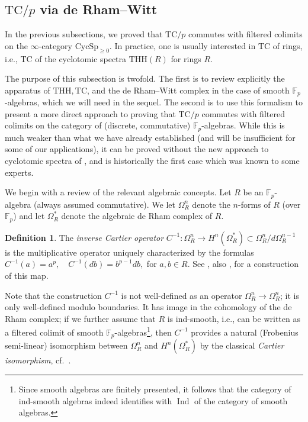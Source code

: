 \documentclass{amsart}
\newcommand{\THH}{\mathrm{THH}}
\theoremstyle{definition}
\newtheorem{definition}{Definition}[section]
\newcommand{\bb}{\mathbb}
\newcommand{\CycSp}{\mathrm{CycSp}}
\newcommand{\TC}{\mathrm{TC}}
\begin{document}
\subsection{$\TC/p$ via de Rham--Witt}

\label{dRWapproach}
In the previous subsections, we proved that $\TC/p$ commutes with filtered
colimits on the $\infty$-category $\CycSp_{\geq 0}$. In practice, one is
usually interested
in $\TC$ of rings, i.e., $\TC$ of the cyclotomic spectra $\THH(R)$ for rings
$R$. 

The purpose of this subsection is twofold. The first is to review explicitly the apparatus
of $\THH, \TC$, and the de Rham--Witt complex in the case of smooth
$\mathbb{F}_p$-algebras, which we will need in the sequel. The
second is to use this formalism to 
present a more direct approach to proving that $\TC/p$ commutes with
filtered  colimits on the category of (discrete, commutative) $\bb
F_p$-algebras. While this is much weaker than what we
have already established (and will be insufficient for some of our
applications), it can be proved without the new approach to cyclotomic spectra of
\cite{nikolaus-scholze}, and is historically the first case which was known to some experts.

We begin with a review of the relevant algebraic concepts. 
Let $R$ be an $\mathbb{F}_p$-algebra (always assumed commutative).  We let $\Omega^n_R$ denote the $n$-forms of $R$ (over $\mathbb{F}_p$) and let $\Omega_R^{\ast}$ denote the algebraic de Rham complex of $R$. 

\begin{definition} 
\label{cartier}
The \emph{inverse Cartier operator} $C^{-1}: \Omega^n_R \to
H^n(\Omega^{\ast}_R) \subset \Omega^n_R/d
\Omega^{n-1}_R$ is the multiplicative operator uniquely characterized by the formulas
\( C^{-1}(a) = a^p, \quad  C^{-1}(db) = b^{p-1} db,   \)
for $a, b \in R$. See \cite{Cartier1957}, also \cite[Prop.~3.3.4]{BLM}, for a construction of this map. 
\end{definition} 
Note that the construction $C^{-1}$ is not well-defined as an operator $\Omega^n_R \to
\Omega^n_R$;
it is only well-defined modulo boundaries. It has image in the
cohomology of the de Rham complex; if we further assume that $R$ is ind-smooth,
i.e., can be written as a filtered colimit of smooth $\mathbb{F}_p$-algebras\footnote{Since smooth algebras are finitely presented, it follows that the category of ind-smooth algebras indeed identifies with $\operatorname{Ind}$ of the category of smooth algebras.}, then $C^{-1}$ provides a natural (Frobenius
semi-linear) isomorphism 
between $\Omega^n_R$ and $H^n( \Omega_R^{\ast})$ by the classical
\emph{Cartier isomorphism}, cf.~\cite[Th.~7.2]{Katz70}. 
\end{document}
